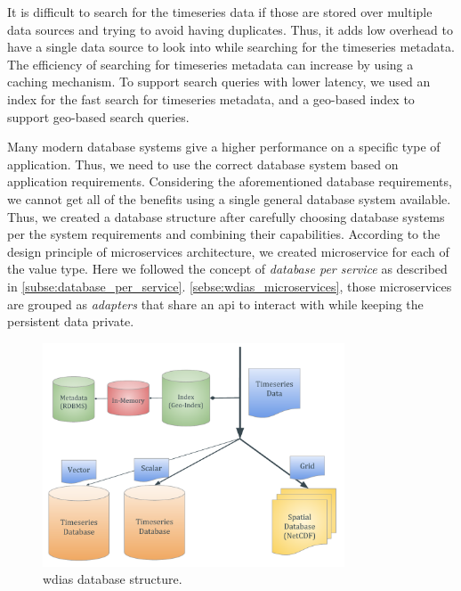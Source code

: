 It is difficult to search for the timeseries data if those are stored over multiple data sources and trying to avoid having duplicates. Thus, it adds low overhead to have a single data source to look into while searching for the timeseries metadata. The efficiency of searching for timeseries metadata can increase by using a caching mechanism. To support search queries with lower latency, we used an index for the fast search for timeseries metadata, and a geo-based index to support geo-based search queries.

Many modern database systems give a higher performance on a specific type of application. Thus, we need to use the correct database system based on application requirements. Considering the aforementioned database requirements, we cannot get all of the benefits using a single general database system available. Thus, we created a database structure after carefully choosing database systems per the system requirements and combining their capabilities. According to the design principle of microservices architecture, we created microservice for each of the value type. Here we followed the concept of \emph{database per service} as described in \cref{subse:database_per_service}. \cref{sebse:wdias_microservices}, those microservices are grouped as \emph{adapters} that share an \acrshort{api} to interact with while keeping the persistent data private.

\begin{figure}[htp]
    \centering
    \includegraphics[width=0.8\textwidth]{method/microservice/wdias_database_structure.pdf}
    \caption{\acrshort{wdias} database structure.}
    \label{fi:database_structure}
\end{figure}


